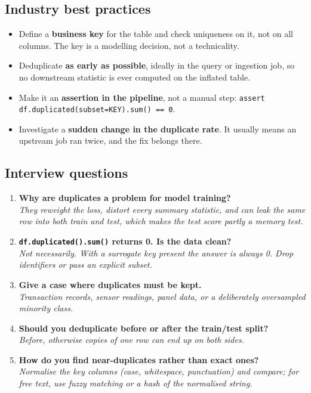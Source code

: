 \documentclass[11pt,a4paper]{article}
\begin{document}
\subsection*{Industry best practices}

\begin{itemize}\itemsep3pt
  \item Define a \textbf{business key} for the table and check uniqueness on it, not on all
        columns. The key is a modelling decision, not a technicality.
  \item Deduplicate \textbf{as early as possible}, ideally in the query or ingestion job,
        so no downstream statistic is ever computed on the inflated table.
  \item Make it an \textbf{assertion in the pipeline}, not a manual step:
        \lstinline|assert df.duplicated(subset=KEY).sum() == 0|.
  \item Investigate a \textbf{sudden change in the duplicate rate}. It usually means an
        upstream job ran twice, and the fix belongs there.
\end{itemize}

\subsection*{Interview questions}

\begin{enumerate}\itemsep4pt
  \item \textbf{Why are duplicates a problem for model training?}\\
        \emph{They reweight the loss, distort every summary statistic, and can leak the same
        row into both train and test, which makes the test score partly a memory test.}
  \item \textbf{\lstinline|df.duplicated().sum()| returns 0. Is the data clean?}\\
        \emph{Not necessarily. With a surrogate key present the answer is always 0. Drop
        identifiers or pass an explicit subset.}
  \item \textbf{Give a case where duplicates must be kept.}\\
        \emph{Transaction records, sensor readings, panel data, or a deliberately
        oversampled minority class.}
  \item \textbf{Should you deduplicate before or after the train/test split?}\\
        \emph{Before, otherwise copies of one row can end up on both sides.}
  \item \textbf{How do you find near-duplicates rather than exact ones?}\\
        \emph{Normalise the key columns (case, whitespace, punctuation) and compare; for
        free text, use fuzzy matching or a hash of the normalised string.}
\end{enumerate}
\end{document}
